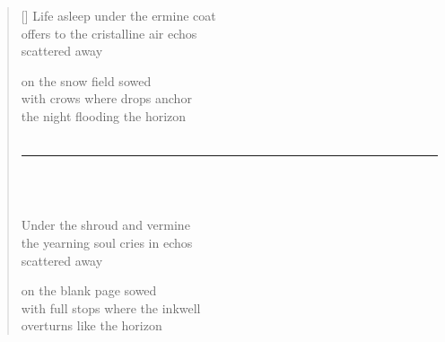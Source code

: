 \documentclass[11pt,a4paper]{article}
\begin{document}
\poemtitle{}

\settowidth{\versewidth}{XXXXXXXXXXXXXXXXXXXXXXx}

\bigskip\bigskip

\begin{verse}[\versewidth]
  Life asleep under the ermine coat \\
  offers to the cristalline air echos \\
  scattered away

  on the snow field sowed \\
  with crows where drops anchor \\
  the night flooding the horizon \\ \

  \rule{0.4\textwidth}{0.4pt}
  \\ \

  Under the shroud and vermine \\
  the yearning soul cries in echos \\
  scattered away

  on the blank page sowed \\
  with full stops where the inkwell \\
  overturns like the horizon
\end{verse}
\end{document}
